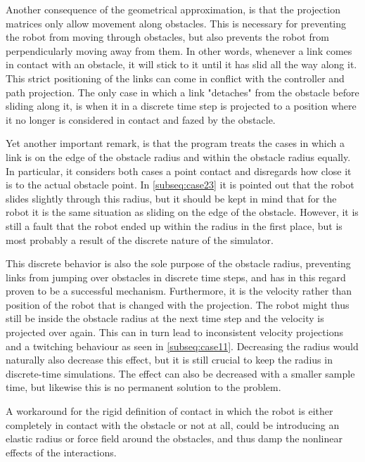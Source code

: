 
Another consequence of the geometrical approximation, is that the projection matrices only allow movement along obstacles. This is necessary for preventing the robot from moving through obstacles, but also prevents the robot from perpendicularly moving away from them. In other words, whenever a link comes in contact with an obstacle, it will stick to it until it has slid all the way along it. This strict positioning of the links can come in conflict with the controller and path projection. The only case in which a link "detaches" from the obstacle before sliding along it, is when it in a discrete time step is projected to a position where it no longer is considered in contact and fazed by the obstacle.

Yet another important remark, is that the program treats the cases in which a link is on the edge of the obstacle radius and within the obstacle radius equally. In particular, it considers both cases a point contact and disregards how close it is to the actual obstacle point. In \ref{subseq:case23} it is pointed out that the robot slides slightly through this radius, but it should be kept in mind that for the robot it is the same situation as sliding on the edge of the obstacle. However, it is still a fault that the robot ended up within the radius in the first place, but is most probably a result of the discrete nature of the simulator.

This discrete behavior is also the sole purpose of the obstacle radius, preventing links from jumping over obstacles in discrete time steps, and has in this regard proven to be a successful mechanism.
Furthermore, it is the velocity rather than position of the robot that is changed with the projection. The robot might thus still be inside the obstacle radius at the next time step and the velocity is projected over again. This can in turn lead to inconsistent velocity projections and a twitching behaviour as seen in \ref{subseq:case11}.
Decreasing the radius would naturally also decrease this effect, but it is still crucial to keep the radius in discrete-time simulations. The effect can also be decreased with a smaller sample time, but likewise this is no permanent solution to the problem.

A workaround for the rigid definition of contact in which the robot is either completely in contact with the obstacle or not at all, could be introducing an elastic radius or force field around the obstacles, and thus damp the nonlinear effects of the interactions. %


